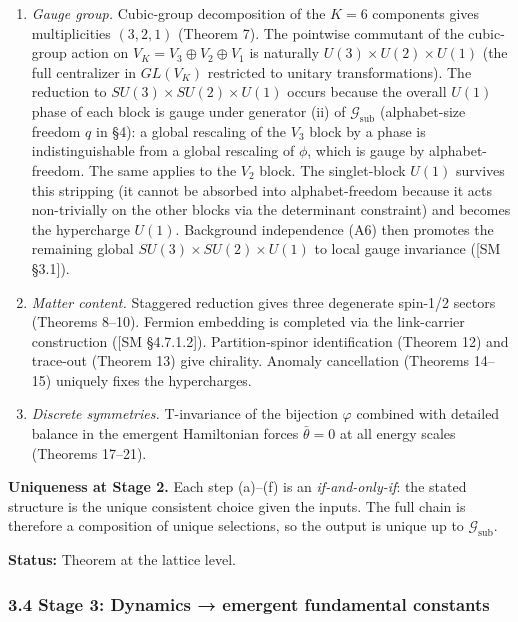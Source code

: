 \documentclass[
]{article}
\begin{document}
\begin{enumerate}
  locks the absolute generation count at three (three spin-1/2 staggered
  tastes emerge from the \(K = 6\) minimum).
\item
  \emph{Gauge group.} Cubic-group decomposition of the \(K = 6\)
  components gives multiplicities \((3, 2, 1)\) (Theorem 7). The
  pointwise commutant of the cubic-group action on
  \(V_K = V_3 \oplus V_2 \oplus V_1\) is naturally
  \(U(3) \times U(2) \times U(1)\) (the full centralizer in \(GL(V_K)\)
  restricted to unitary transformations). The reduction to
  \(SU(3) \times SU(2) \times U(1)\) occurs because the overall \(U(1)\)
  phase of each block is gauge under generator (ii) of
  \(\mathcal{G}_{\text{sub}}\) (alphabet-size freedom \(q\) in §4): a
  global rescaling of the \(V_3\) block by a phase is indistinguishable
  from a global rescaling of \(\phi\), which is gauge by
  alphabet-freedom. The same applies to the \(V_2\) block. The
  singlet-block \(U(1)\) survives this stripping (it cannot be absorbed
  into alphabet-freedom because it acts non-trivially on the other
  blocks via the determinant constraint) and becomes the hypercharge
  \(U(1)\). Background independence (A6) then promotes the remaining
  global \(SU(3) \times SU(2) \times U(1)\) to local gauge invariance
  ({[}SM §3.1{]}).
\item
  \emph{Matter content.} Staggered reduction gives three degenerate
  spin-1/2 sectors (Theorems 8--10). Fermion embedding is completed via
  the link-carrier construction ({[}SM §4.7.1.2{]}). Partition-spinor
  identification (Theorem 12) and trace-out (Theorem 13) give chirality.
  Anomaly cancellation (Theorems 14--15) uniquely fixes the
  hypercharges.
\item
  \emph{Discrete symmetries.} T-invariance of the bijection \(\varphi\)
  combined with detailed balance in the emergent Hamiltonian forces
  \(\bar\theta = 0\) at all energy scales (Theorems 17--21).
\end{enumerate}

\textbf{Uniqueness at Stage 2.} Each step (a)--(f) is an
\emph{if-and-only-if}: the stated structure is the unique consistent
choice given the inputs. The full chain is therefore a composition of
unique selections, so the output is unique up to
\(\mathcal{G}_{\text{sub}}\).

\textbf{Status:} Theorem at the lattice level.

\hypertarget{stage-3-dynamics-emergent-fundamental-constants}{%
\subsubsection{3.4 Stage 3: Dynamics → emergent fundamental
constants}\label{stage-3-dynamics-emergent-fundamental-constants}}
\end{document}
